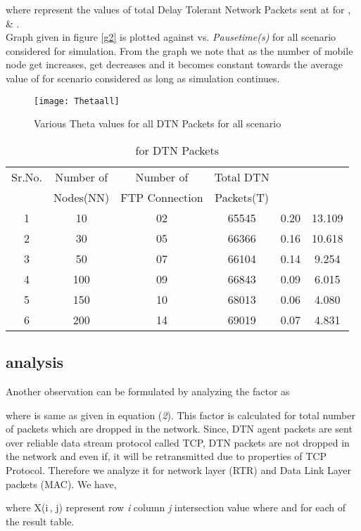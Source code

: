 \documentclass[3p,times]{elsarticle}
\begin{document}
where  represent the values of total Delay Tolerant Network Packets sent at  for ,  \& . \\
Graph given in figure \ref{g2} is plotted against   vs. \emph{Pausetime(s)} for all scenario considered for simulation. From the graph we note that as the number of mobile node get increases,  get decreases and it becomes constant towards the average value of   for scenario considered as long as simulation continues. 
\begin{figure}[h]
\centering
\mbox{\texttt{[image: Thetaall]}}
\caption{Various Theta values for all DTN Packets for all scenario}
\label{g5}
\end{figure}

\begin{table}[t]
\centering
\caption{ for DTN Packets }
\begin{tabular}{|c|c|c|c|c|c|}
\hline
Sr.No. & Number of  & Number of  & Total DTN  &  &  \\
 &  Nodes(NN) &  FTP Connection  &  Packets(T) && \\
\hline
1 & 10 & 02 & 65545 & 0.20 & 13.109 \\
2 & 30 & 05 & 66366 & 0.16 & 10.618\\
3 & 50 & 07 & 66104 & 0.14 & 9.254 \\
4 & 100 & 09 & 66843 & 0.09 & 6.015 \\
5 & 150 & 10 & 68013 & 0.06 & 4.080 \\
6 & 200 & 14 & 69019 & 0.07 & 4.831 \\
\hline
\end{tabular}
\label{t15}
\end{table}

\subsection{ analysis}   
Another observation can be formulated by analyzing the factor  as 

where  is same as given in equation (\emph{2}).
This factor  is calculated for total number of packets which are dropped in the network. Since, DTN agent packets are sent over reliable data stream protocol called TCP, DTN packets are not dropped in the network and even if, it will be retransmitted due to properties of TCP Protocol. Therefore we analyze it for network layer (RTR) and Data Link Layer packets (MAC). We have, 

where X(i\,, j) represent row \emph{i} column \emph{j} intersection value where  and  for each of the result table.
\end{document}
